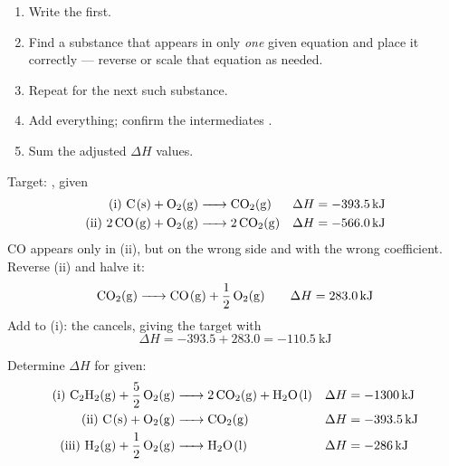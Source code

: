 \documentclass{apchem-notes}
\begin{document}


\begin{enumerate}[leftmargin=*,itemsep=0.2em]
  \item Write the  first.
  \item Find a substance that appears in only \emph{one} given equation and
        place it correctly --- reverse or scale that equation as needed.
  \item Repeat for the next such substance.
  \item Add everything; confirm the intermediates
        .
  \item Sum the adjusted $\Delta H$ values.
\end{enumerate}

\begin{workedexample}
Target: , given
\begin{align*}
  \text{(i)}\ \ce{C(s) + O2(g) &-> CO2(g)} &\Delta H &= \SI{-393.5}{\kilo\joule}\\
  \text{(ii)}\ \ce{2 CO(g) + O2(g) &-> 2 CO2(g)} &\Delta H &= \SI{-566.0}{\kilo\joule}
\end{align*}
CO appears only in (ii), but on the wrong side and with the wrong
coefficient. Reverse (ii) and halve it:
\[ \ce{CO2(g) -> CO(g) + 1/2 O2(g)} \qquad \Delta H = \SI{+283.0}{\kilo\joule} \]
Add to (i): the  cancels, giving the target with
\[ \Delta H = -393.5 + 283.0 = \SI{-110.5}{\kilo\joule} \]
\end{workedexample}


Determine $\Delta H$ for  given:
\begin{align*}
  \text{(i)}\ \ce{C2H2(g) + 5/2 O2(g) &-> 2 CO2(g) + H2O(l)} &\Delta H &= \SI{-1300.}{\kilo\joule}\\
  \text{(ii)}\ \ce{C(s) + O2(g) &-> CO2(g)} &\Delta H &= \SI{-393.5}{\kilo\joule}\\
  \text{(iii)}\ \ce{H2(g) + 1/2 O2(g) &-> H2O(l)} &\Delta H &= \SI{-286}{\kilo\joule}
\end{align*}

\workspace[4.4cm]
\end{document}
